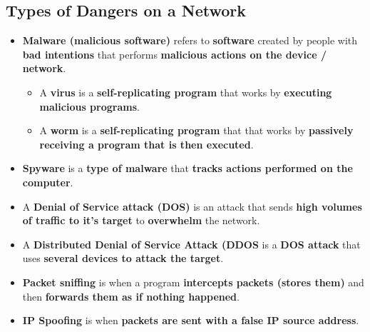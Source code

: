 \documentclass{article}
\begin{document}
    \subsection*{Types of Dangers on a Network}
    \begin{itemize}
        \item \textbf{Malware (malicious software)} refers to \textbf{software} created by people with \textbf{bad intentions} that performs \textbf{malicious actions on the device / network}.
        \begin{itemize}
            \item A \textbf{virus} is a \textbf{self-replicating program} that works by \textbf{executing malicious programs}.
            \item A \textbf{worm} is a \textbf{self-replicating program} that that works by \textbf{passively receiving a program that is then executed}.
        \end{itemize}
        \item \textbf{Spyware} is a \textbf{type of malware} that \textbf{tracks actions performed on the computer}.
        \item A \textbf{Denial of Service attack (DOS)} is an attack that sends \textbf{high volumes of traffic to it's target} to \textbf{overwhelm} the network.
        \item A \textbf{Distributed Denial of Service Attack (DDOS} is a \textbf{DOS attack} that uses \textbf{several devices to attack the target}.
        \item \textbf{Packet sniffing} is when a program \textbf{intercepts packets (stores them)} and then \textbf{forwards them as if nothing happened}.
        \item \textbf{IP Spoofing} is when \textbf{packets are sent with a false IP source address}.
    \end{itemize}
\end{document}
